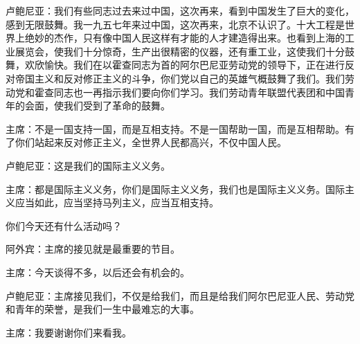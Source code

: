 卢鲍尼亚：我们有些同志过去来过中国，这次再来，看到中国发生了巨大的变化，感到无限鼓舞。我一九五七年来过中国，这次再来，北京不认识了。十大工程是世界上绝妙的杰作，只有像中国人民这样有才能的人才建造得出来。也看到上海的工业展览会，使我们十分惊奇，生产出很精密的仪器，还有重工业，这使我们十分鼓舞，欢欣愉快。我们在以霍查同志为首的阿尔巴尼亚劳动党的领导下，正在进行反对帝国主义和反对修正主义的斗争，你们党以自己的英雄气概鼓舞了我们。我们劳动党和霍查同志也一再指示我们要向你们学习。我们劳动青年联盟代表团和中国青年的会面，使我们受到了革命的鼓舞。

主席：不是一国支持一国，而是互相支持。不是一国帮助一国，而是互相帮助。有了你们站起来反对修正主义，全世界人民都高兴，不仅中国人民。

卢鲍尼亚：这是我们的国际主义义务。

主席：都是国际主义义务，你们是国际主义义务，我们也是国际主义义务。国际主义应当如此，应当坚持马列主义，应当互相支持。

你们今天还有什么活动吗？

阿外宾：主席的接见就是最重要的节目。

主席：今天谈得不多，以后还会有机会的。

卢鲍尼亚：主席接见我们，不仅是给我们，而且是给我们阿尔巴尼亚人民、劳动党和青年的荣誉，是我们一生中最难忘的大事。

主席：我要谢谢你们来看我。


